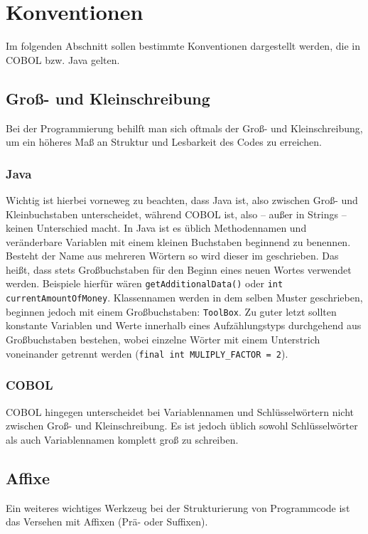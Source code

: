 \section{Konventionen}
Im folgenden Abschnitt sollen bestimmte Konventionen dargestellt werden, die in COBOL bzw. Java gelten.
\subsection*{Groß- und Kleinschreibung}
Bei der Programmierung behilft man sich oftmals der Groß- und Kleinschreibung, um ein höheres Maß an Struktur und Lesbarkeit des Codes zu erreichen. 
\subsubsection*{Java}
Wichtig ist hierbei vorneweg zu beachten, dass Java  ist, also zwischen Groß- und Kleinbuchstaben unterscheidet, während COBOL  ist, also -- außer in Strings -- keinen Unterschied macht.
In Java ist es üblich Methodennamen und veränderbare Variablen mit einem kleinen Buchstaben beginnend zu benennen. Besteht der Name aus mehreren Wörtern so wird dieser im  geschrieben. Das heißt, dass stets Großbuchstaben für den Beginn eines neuen Wortes verwendet werden. Beispiele hierfür wären \texttt{getAdditionalData()} oder \texttt{int currentAmountOfMoney}. Klassennamen werden in dem selben Muster geschrieben, beginnen jedoch mit einem Großbuchstaben: \texttt{ToolBox}. Zu guter letzt sollten konstante Variablen und Werte innerhalb eines Aufzählungstyps durchgehend aus Großbuchstaben bestehen, wobei einzelne Wörter mit einem Unterstrich voneinander getrennt werden (\texttt{final int MULIPLY_FACTOR = 2}). 
\subsubsection*{COBOL}
COBOL hingegen unterscheidet bei Variablennamen und Schlüsselwörtern nicht zwischen Groß- und Kleinschreibung. Es ist jedoch üblich sowohl Schlüsselwörter als auch Variablennamen komplett groß zu schreiben. 
\subsection*{Affixe}
Ein weiteres wichtiges Werkzeug bei der Strukturierung von Programmcode ist das Versehen mit Affixen (Prä- oder Suffixen).
